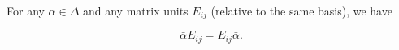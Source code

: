 For any $\alpha \in \Delta$ and any matrix units $E_{ij}$ (relative to the same basis), we have

$$\bar{\alpha} E_{ij} = E_{ij} \bar{\alpha}.$$
